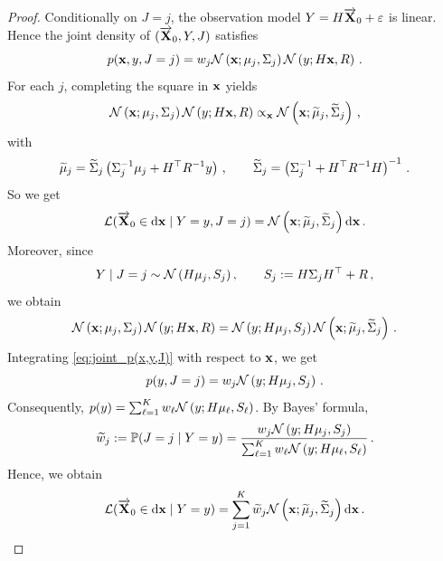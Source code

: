 \documentclass[11pt]{article}
\theoremstyle{plain}
\theoremstyle{definition}
\theoremstyle{remark}
\begin{document}
\begin{proof}
Conditionally on $J=j$, the observation model $Y  = H \overrightarrow{\mathbf{X}}_0+\varepsilon$ is linear. Hence the joint density of $(\overrightarrow{\mathbf{X}}_0,Y,J)$ satisfies
\begin{equation} \label{eq:joint_p(x,y,J)}
p(\x,\xobs,J=j) 
= w_j \gaussiand{\mu_j}{\Sigma_j}[\x] \gaussiand{H\x}{R}[\xobs] \eqsp.
\end{equation}
For each $j$, completing the square in $\mathbf{x}$ yields
\begin{equation}
\gaussiand{\mu_j}{\Sigma_j}[\x] \gaussiand{H\x}{R}[\xobs]
\propto_{\x} \gaussiand{\widetilde\mu_j}{\widetilde\Sigma_j}[\x] \eqsp,
\end{equation}
with
$$
\widetilde\mu_j = \widetilde\Sigma_j \left(  \Sigma_j^{-1}\mu_j+H^\top R^{-1}y \right) \,, \qquad 
\widetilde\Sigma_j = \left(\Sigma_j^{-1}+H^\top R^{-1}H\right)^{-1} \,.
$$
So we get
$$
\mathcal L(\Xora_0\in\rmd\x\mid \Xobs=\xobs,J=j)
= \gaussiand{\widetilde\mu_j}{\widetilde\Sigma_j}[\x]\rmd\x \eqsp.
$$
Moreover, since 
\begin{equation} \label{eq:Y_knowing_J}
\Xobs\mid J=j \sim \gaussiand{H\mu_j}{S_j}, \qquad S_j\eqdef H\Sigma_jH^\top+R \eqsp,
\end{equation}
we obtain 
\begin{equation} \label{eq:gaussian_product_identity_posterior} \gaussiand{\mu_j}{\Sigma_j}[\x] \gaussiand{H\x}{R}[\xobs] 
= \gaussiand{H\mu_j}{S_j}[\xobs] \gaussiand{\widetilde\mu_j}{\widetilde\Sigma_j}[\x] \eqsp. 
\end{equation} 
Integrating \eqref{eq:joint_p(x,y,J)} with respect to $\mathbf{x}$, we get
$$
p(\xobs,J=j) = w_j\gaussiand{H\mu_j}{S_j}[\xobs] \eqsp.
$$
Consequently, $p(\xobs)  = \sum_{\ell=1}^{K}w_\ell\gaussiand{H\mu_\ell}{S_\ell}[\xobs]$. By Bayes' formula,
$$
\widetilde w_j \eqdef \mathbb P(J=j\mid \Xobs=\xobs) = \frac{ w_j\gaussiand{H\mu_j}{S_j}[\xobs] }{ \sum_{\ell=1}^{K} w_\ell \gaussiand{H\mu_\ell}{S_\ell}[\xobs] } \eqsp.
$$
%
Hence, we obtain
$$
\mathcal L(\Xora_0\in\rmd\x\mid \Xobs=\xobs)
= \sum_{j=1}^{K} \widetilde w_j \gaussiand{\widetilde\mu_j}{\widetilde\Sigma_j}[\x]\rmd\x \eqsp.
$$
\end{proof}
\end{document}
